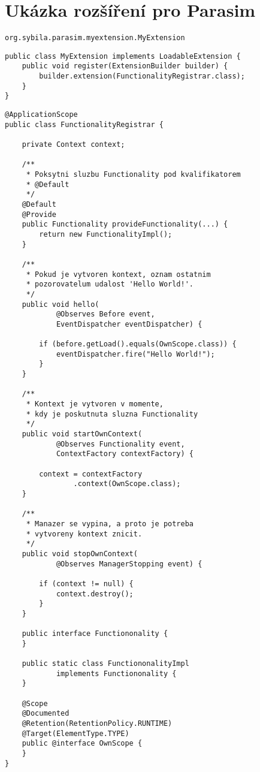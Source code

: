 \chapter{Ukázka rozšíření pro Parasim}\label{appendix:extension}

\begin{lstlisting}[caption={META-INF/services/org.sybila.parasim.core.spi.\\LoadableExtension}]
org.sybila.parasim.myextension.MyExtension
\end{lstlisting}


\begin{lstlisting}[caption={org/sybila/parasim/myextension/MyExtension.java}]
public class MyExtension implements LoadableExtension {
    public void register(ExtensionBuilder builder) {
        builder.extension(FunctionalityRegistrar.class);
    }
}
\end{lstlisting}

\begin{lstlisting}[caption={org/sybila/parasim/myextension/\\FunctionalityRegistrar.java}]
@ApplicationScope
public class FunctionalityRegistrar {

	private Context context;
	
	/**
     * Poksytni sluzbu Functionality pod kvalifikatorem
     * @Default
     */
	@Default
	@Provide
    public Functionality provideFunctionality(...) {
        return new FunctionalityImpl();
    }

	/**
     * Pokud je vytvoren kontext, oznam ostatnim
     * pozorovatelum udalost 'Hello World!'.
     */
	public void hello(
			@Observes Before event,
			EventDispatcher eventDispatcher) {
	
		if (before.getLoad().equals(OwnScope.class)) {
			eventDispatcher.fire("Hello World!");
		}
	}

	/**
     * Kontext je vytvoren v momente,
     * kdy je poskutnuta sluzna Functionality
	 */
	public void startOwnContext(
			@Observes Functionality event,
			ContextFactory contextFactory) {
		
		context = contextFactory
				.context(OwnScope.class);
	}

	/**
     * Manazer se vypina, a proto je potreba
     * vytvoreny kontext znicit.
     */
	public void stopOwnContext(
			@Observes ManagerStopping event) {

		if (context != null) {
			context.destroy();
		}
	}

	public interface Functiononality {
	}

	public static class FunctiononalityImpl
			implements Functiononality {
	}

	@Scope
	@Documented
	@Retention(RetentionPolicy.RUNTIME)
	@Target(ElementType.TYPE)
	public @interface OwnScope {
	}
}
\end{lstlisting}
